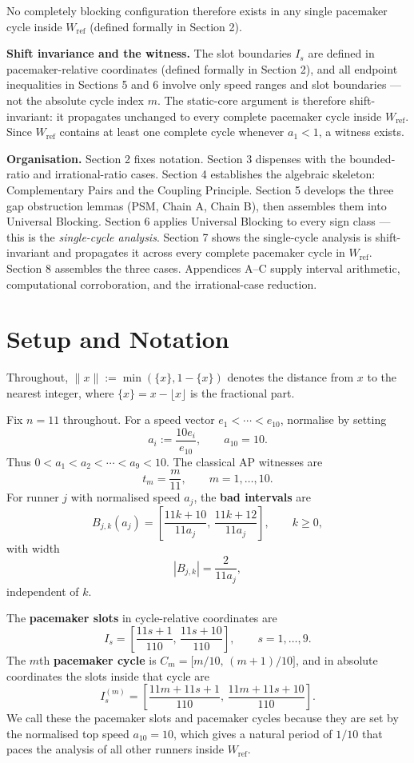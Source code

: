 \documentclass[12pt]{article}
\begin{document}
No completely blocking configuration therefore exists in any single pacemaker cycle
inside $W_{\mathrm{ref}}$ (defined formally in Section 2).

\textbf{Shift invariance and the witness.}
The slot boundaries $I_s$ are defined in pacemaker-relative coordinates (defined formally
in Section 2), and all endpoint inequalities in Sections 5 and 6 involve only speed ranges
and slot boundaries — not the absolute cycle index $m$. The static-core argument is
therefore shift-invariant: it propagates unchanged to every complete pacemaker cycle
inside $W_{\mathrm{ref}}$. Since $W_{\mathrm{ref}}$ contains at least one complete cycle
whenever $a_1<1$, a witness exists.

\textbf{Organisation.} Section 2 fixes notation. Section 3 dispenses with the bounded-ratio
and irrational-ratio cases. Section 4 establishes the algebraic skeleton: Complementary
Pairs and the Coupling Principle. Section 5 develops the three gap obstruction lemmas
(PSM, Chain A, Chain B), then assembles them into Universal Blocking. Section 6 applies
Universal Blocking to every sign class — this is the \emph{single-cycle analysis}. Section 7
shows the single-cycle analysis is shift-invariant and propagates it across every complete
pacemaker cycle in $W_{\mathrm{ref}}$. Section 8 assembles the three cases. Appendices A–C
supply interval arithmetic, computational corroboration, and the irrational-case reduction.



\section{Setup and Notation}

Throughout, $\|x\| := \min(\{x\}, 1-\{x\})$ denotes the distance from $x$ to the nearest
integer, where $\{x\}=x-\lfloor x\rfloor$ is the fractional part.

Fix $n=11$ throughout. For a speed vector $e_1<\cdots<e_{10}$, normalise by setting
\[
a_i := \frac{10e_i}{e_{10}},\qquad a_{10}=10.
\]
Thus $0<a_1<a_2<\cdots<a_9<10$. The classical AP witnesses are
\[
t_m = \frac{m}{11},\qquad m=1,\ldots,10.
\]
For runner $j$ with normalised speed $a_j$, the \textbf{bad intervals} are
\[
B_{j,k}(a_j) = \left[\frac{11k+10}{11a_j},\,\frac{11k+12}{11a_j}\right],\qquad k\ge 0,
\]
with width
\[
|B_{j,k}| = \frac{2}{11a_j},
\]
independent of $k$.

The \textbf{pacemaker slots} in cycle-relative coordinates are
\[
I_s = \left[\frac{11s+1}{110},\,\frac{11s+10}{110}\right],\qquad s=1,\ldots,9.
\]
The $m$th \textbf{pacemaker cycle} is $C_m=\bigl[m/10,\,(m+1)/10\bigr]$, and in absolute
coordinates the slots inside that cycle are
\[
I_s^{(m)} = \left[\frac{11m+11s+1}{110},\,\frac{11m+11s+10}{110}\right].
\]
We call these the pacemaker slots and pacemaker cycles because they are set by the
normalised top speed $a_{10}=10$, which gives a natural period of $1/10$ that paces the
analysis of all other runners inside $W_{\mathrm{ref}}$.
\end{document}
